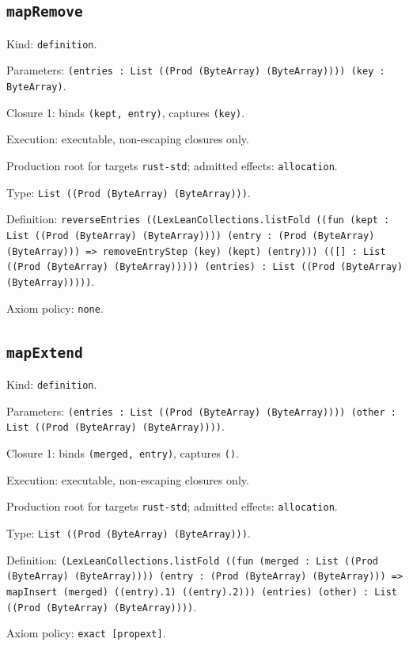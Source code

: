 \documentclass[11pt]{article}
\begin{document}
\subsection*{\texttt{mapRemove}}
\noindent Kind: \texttt{definition}.\par
\noindent Parameters: \texttt{(entries : List ((Prod (ByteArray) (ByteArray)))) (key : ByteArray)}.\par
\noindent Closure 1: binds \texttt{(kept, entry)}, captures \texttt{(key)}.\par
\noindent Execution: executable, non-escaping closures only.\par
\noindent Production root for targets \texttt{rust-std}; admitted effects: \texttt{allocation}.\par
\noindent Type: \texttt{List ((Prod (ByteArray) (ByteArray)))}.\par
\noindent Definition: \texttt{reverseEntries ((LexLeanCollections.listFold ((fun (kept : List ((Prod (ByteArray) (ByteArray)))) (entry : (Prod (ByteArray) (ByteArray))) => removeEntryStep (key) (kept) (entry))) (([] : List ((Prod (ByteArray) (ByteArray))))) (entries) : List ((Prod (ByteArray) (ByteArray)))))}.\par
\noindent Axiom policy: \texttt{none}.\par
\subsection*{\texttt{mapExtend}}
\noindent Kind: \texttt{definition}.\par
\noindent Parameters: \texttt{(entries : List ((Prod (ByteArray) (ByteArray)))) (other : List ((Prod (ByteArray) (ByteArray))))}.\par
\noindent Closure 1: binds \texttt{(merged, entry)}, captures \texttt{()}.\par
\noindent Execution: executable, non-escaping closures only.\par
\noindent Production root for targets \texttt{rust-std}; admitted effects: \texttt{allocation}.\par
\noindent Type: \texttt{List ((Prod (ByteArray) (ByteArray)))}.\par
\noindent Definition: \texttt{(LexLeanCollections.listFold ((fun (merged : List ((Prod (ByteArray) (ByteArray)))) (entry : (Prod (ByteArray) (ByteArray))) => mapInsert (merged) ((entry).1) ((entry).2))) (entries) (other) : List ((Prod (ByteArray) (ByteArray))))}.\par
\noindent Axiom policy: \texttt{exact [propext]}.\par
\end{document}
